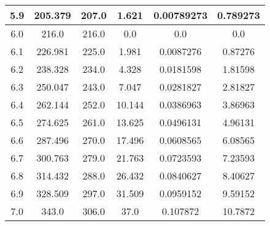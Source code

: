 \begin{table}[h!]
\begin{tabular}{|c|c|c|c|c|c|}
        5.9        & 205.379        & 207.0              & 1.621        & 0.00789273        & 0.789273          \\ \hline
        6.0        & 216.0          & 216.0              & 0.0          & 0.0               & 0.0               \\ \hline
        6.1        & 226.981        & 225.0              & 1.981        & 0.0087276         & 0.87276           \\ \hline
        6.2        & 238.328        & 234.0              & 4.328        & 0.0181598         & 1.81598           \\ \hline
        6.3        & 250.047        & 243.0              & 7.047        & 0.0281827         & 2.81827           \\ \hline
        6.4        & 262.144        & 252.0              & 10.144       & 0.0386963         & 3.86963           \\ \hline
        6.5        & 274.625        & 261.0              & 13.625       & 0.0496131         & 4.96131           \\ \hline
        6.6        & 287.496        & 270.0              & 17.496       & 0.0608565         & 6.08565           \\ \hline
        6.7        & 300.763        & 279.0              & 21.763       & 0.0723593         & 7.23593           \\ \hline
        6.8        & 314.432        & 288.0              & 26.432       & 0.0840627         & 8.40627           \\ \hline
        6.9        & 328.509        & 297.0              & 31.509       & 0.0959152         & 9.59152           \\ \hline
        7.0        & 343.0          & 306.0              & 37.0         & 0.107872          & 10.7872           \\ \hline
    \end{tabular}\label{tab:table4}
\end{table}
